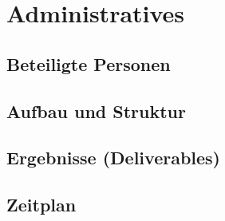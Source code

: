 \chapter{Administratives}
\label{chap:administratives}

\section{Beteiligte Personen}

\section{Aufbau und Struktur}

\section{Ergebnisse (Deliverables)}

\section{Zeitplan}
